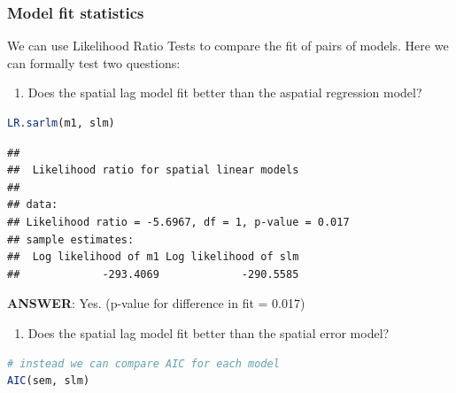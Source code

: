 \documentclass[
]{book}
\providecommand{\tightlist}{%
  \setlength{\itemsep}{0pt}\setlength{\parskip}{0pt}}
\begin{document}
\hypertarget{model-fit-statistics}{%
\subsubsection{Model fit statistics}\label{model-fit-statistics}}

We can use Likelihood Ratio Tests to compare the fit of pairs of models. Here we can formally test two questions:

\begin{enumerate}
\def\labelenumi{\arabic{enumi}.}
\tightlist
\item
  Does the spatial lag model fit better than the aspatial regression model?
\end{enumerate}

\begin{lstlisting}[language=R]
LR.sarlm(m1, slm)
\end{lstlisting}

\begin{lstlisting}
## 
## 	Likelihood ratio for spatial linear models
## 
## data:  
## Likelihood ratio = -5.6967, df = 1, p-value = 0.017
## sample estimates:
##  Log likelihood of m1 Log likelihood of slm 
##             -293.4069             -290.5585
\end{lstlisting}

\textbf{ANSWER}: Yes. (p-value for difference in fit = 0.017)

\begin{enumerate}
\def\labelenumi{\arabic{enumi}.}
\setcounter{enumi}{1}
\tightlist
\item
  Does the spatial lag model fit better than the spatial error model?
\end{enumerate}

\begin{lstlisting}[language=R]
# instead we can compare AIC for each model
AIC(sem, slm)
\end{lstlisting}

 
  \providecommand{\huxb}[2]{\arrayrulecolor[RGB]{#1}\global\arrayrulewidth=#2pt}
  \providecommand{\huxvb}[2]{\color[RGB]{#1}\vrule width #2pt}
  \providecommand{\huxtpad}[1]{\rule{0pt}{#1}}
  \providecommand{\huxbpad}[1]{\rule[-#1]{0pt}{#1}}
\end{document}
